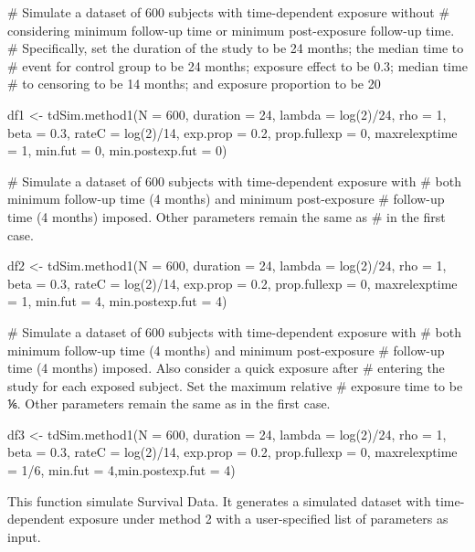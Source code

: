 \documentclass[a4paper]{book}
\begin{document}
\begin{Examples}
\begin{ExampleCode}
# Simulate a dataset of 600 subjects with time-dependent exposure without
# considering minimum follow-up time or minimum post-exposure follow-up time.
# Specifically, set the duration of the study to be 24 months; the median time to
# event for control group to be 24 months; exposure effect to be 0.3; median time
# to censoring to be 14 months; and exposure proportion to be 20%

df1 <- tdSim.method1(N = 600, duration = 24, lambda = log(2)/24, rho = 1, 
   beta = 0.3, rateC = log(2)/14, exp.prop = 0.2, prop.fullexp  = 0, 
   maxrelexptime = 1, min.fut = 0, min.postexp.fut = 0)

# Simulate a dataset of 600 subjects with time-dependent exposure with
# both minimum follow-up time (4 months) and minimum post-exposure
# follow-up time (4 months) imposed. Other parameters remain the same as
# in the first case.

df2 <- tdSim.method1(N = 600, duration = 24, lambda = log(2)/24, rho = 1, 
   beta = 0.3, rateC = log(2)/14, exp.prop = 0.2, prop.fullexp  = 0, 
   maxrelexptime = 1, min.fut = 4, min.postexp.fut = 4)

# Simulate a dataset of 600 subjects with time-dependent exposure with
# both minimum follow-up time (4 months) and minimum post-exposure
# follow-up time (4 months) imposed. Also consider a quick exposure after
# entering the study for each exposed subject. Set the maximum relative
# exposure time to be ⅙. Other parameters remain the same as in the first case.

df3 <- tdSim.method1(N = 600, duration = 24, lambda = log(2)/24, rho = 1, 
   beta = 0.3, rateC = log(2)/14, exp.prop = 0.2, prop.fullexp  = 0,
   maxrelexptime = 1/6, min.fut = 4,min.postexp.fut = 4)
\end{ExampleCode}
\end{Examples}
%
\begin{Description}\relax

This function simulate Survival Data. It generates a simulated dataset with time-dependent exposure under method 2 with a user-specified list of parameters as input.
\end{Description}
\end{document}
